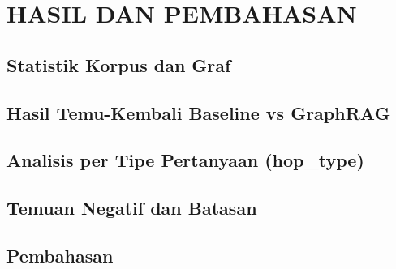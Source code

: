 \chapter{HASIL DAN PEMBAHASAN}
\label{bab:hasil}


\section{Statistik Korpus dan Graf}

\section{Hasil Temu-Kembali Baseline vs GraphRAG}

\section{Analisis per Tipe Pertanyaan (hop\_type)}

\section{Temuan Negatif dan Batasan}

\section{Pembahasan}
